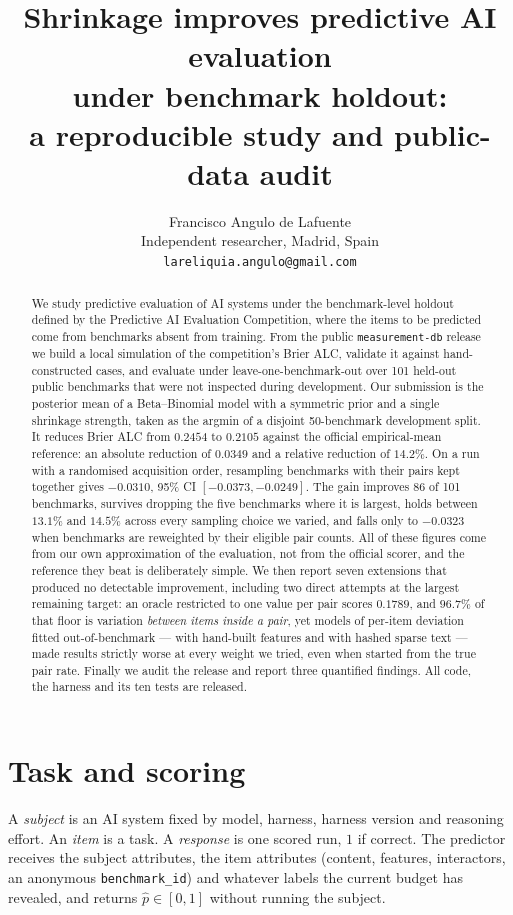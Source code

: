 \documentclass{article}
\title{Shrinkage improves predictive AI evaluation\\
under benchmark holdout:\\
a reproducible study and public-data audit}
\author{%
  Francisco Angulo de Lafuente\\
  Independent researcher, Madrid, Spain\\
  \texttt{lareliquia.angulo@gmail.com}\\
}
\begin{document}
\maketitle

\begin{abstract}
We study predictive evaluation of AI systems under the benchmark-level holdout
defined by the Predictive AI Evaluation Competition, where the items to be
predicted come from benchmarks absent from training. From the public
\texttt{measurement-db} release we build a local simulation of the competition's
Brier ALC, validate it against hand-constructed cases, and evaluate under
leave-one-benchmark-out over 101 held-out public benchmarks that were not
inspected during development. Our submission is the posterior mean of a
Beta--Binomial model with a symmetric prior and a single shrinkage strength,
taken as the argmin of a disjoint 50-benchmark development split. It reduces
Brier ALC from $0.2454$ to $0.2105$ against the official empirical-mean
reference: an absolute reduction of $0.0349$ and a relative reduction of
$14.2\%$. On a run with a randomised acquisition order, resampling benchmarks with their
pairs kept together gives $-0.0310$, 95\% CI $[-0.0373,-0.0249]$. The gain improves 86 of 101 benchmarks,
survives dropping the five benchmarks where it is largest, holds between
$13.1\%$ and $14.5\%$ across every sampling choice we varied, and falls only to
$-0.0323$ when benchmarks are reweighted by their eligible pair counts. All of
these figures come from our own approximation of the evaluation, not from the
official scorer, and the reference they beat is deliberately simple.
We then report seven extensions that produced no detectable improvement, including
two direct attempts at the largest remaining target: an oracle restricted to one
value per pair scores $0.1789$, and $96.7\%$ of that floor is variation
\emph{between items inside a pair}, yet models of per-item deviation fitted
out-of-benchmark --- with hand-built features and with hashed sparse text ---
made results strictly worse at every weight we tried, even when started from the
true pair rate.
Finally we audit the release and report three quantified findings. All code, the
harness and its ten tests are released.
\end{abstract}

\section{Task and scoring}

A \emph{subject} is an AI system fixed by model, harness, harness version and
reasoning effort. An \emph{item} is a task. A \emph{response} is one scored run,
$1$ if correct. The predictor receives the subject attributes, the item
attributes (content, features, interactors, an anonymous \texttt{benchmark\_id})
and whatever labels the current budget has revealed, and returns
$\hat p \in [0,1]$ without running the subject.
\end{document}
